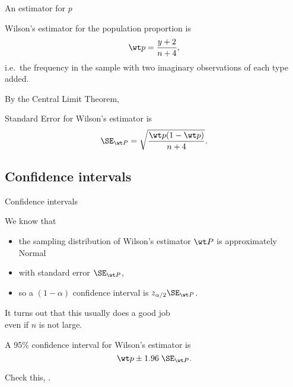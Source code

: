 \begin{frame}{An estimator for $p$}

    \begin{block}{Wilson's estimator}
        for the population proportion is
        \[ \wt p = \frac{ y+2 }{ n+4 } ,\]
        i.e.\ the frequency in the sample with two imaginary observations of each type added.
    \end{block}

    \vspace{2em}

    By the Central Limit Theorem,

    \begin{block}{Standard Error}
        for Wilson's estimator is
        \[ \SE_{\wt P} = \sqrt{\frac{\wt p (1-\wt p)}{n+4} } .\]
    \end{block}


\end{frame}

\subsection{Confidence intervals}

\begin{frame}{Confidence intervals}

    We know that 
    \begin{itemize}
        \item the sampling distribution of Wilson's estimator $\wt P$ is approximately Normal
        \item with standard error $\SE_{\wt P}$,
        \item so a $(1-\alpha)$ confidence interval is $z_{\alpha/2} \SE_{\wt P}$.
    \end{itemize}
    It turns out that this usually does a good job \\
    \alert{even if $n$ is not large.}

    \vspace{2em}

    \begin{block}{A 95\% confidence interval}
        for Wilson's estimator is
        \[ \wt p \pm 1.96 \; \SE_{\wt P} . \]
    \end{block}

    \vspace{2em}

    Check this, .

\end{frame}


